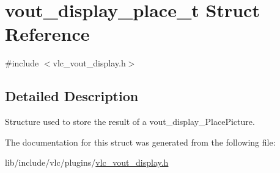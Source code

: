 \hypertarget{structvout__display__place__t}{}\section{vout\+\_\+display\+\_\+place\+\_\+t Struct Reference}
\label{structvout__display__place__t}


{\ttfamily \#include $<$vlc\+\_\+vout\+\_\+display.\+h$>$}



\subsection{Detailed Description}
Structure used to store the result of a vout\+\_\+display\+\_\+\+Place\+Picture. 

The documentation for this struct was generated from the following file\+:\begin{DoxyCompactItemize}
\item 
lib/include/vlc/plugins/\hyperlink{vlc__vout__display_8h}{vlc\+\_\+vout\+\_\+display.\+h}\end{DoxyCompactItemize}
